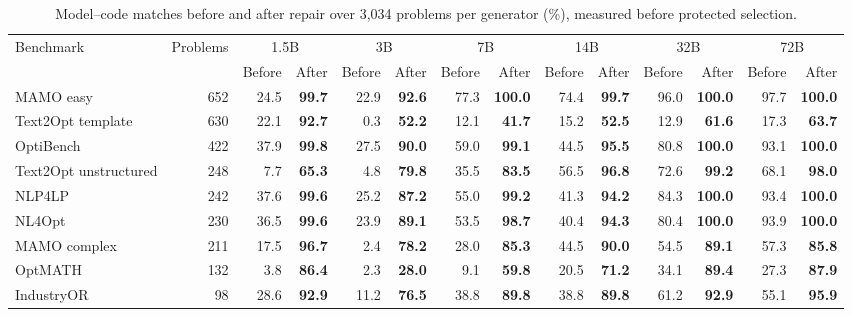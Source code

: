 \begin{table}[htbp]
\caption{Model--code matches before and after repair over 3,034 problems per generator (\%), measured before protected selection.}
\label{tab:completionmatrix}
\centering\footnotesize\renewcommand{\arraystretch}{0.96}\setlength{\tabcolsep}{0.5pt}
\begin{tabular*}{\textwidth}{@{\extracolsep{\fill}}lrrrrrrrrrrrrr@{}}
\toprule
\multirow{2}{*}{Benchmark} & \multirow{2}{*}{Problems} & \multicolumn{2}{c}{1.5B} & \multicolumn{2}{c}{3B} & \multicolumn{2}{c}{7B} & \multicolumn{2}{c}{14B} & \multicolumn{2}{c}{32B} & \multicolumn{2}{c}{72B} \\
\cmidrule(lr){3-4}\cmidrule(lr){5-6}\cmidrule(lr){7-8}\cmidrule(lr){9-10}\cmidrule(lr){11-12}\cmidrule(lr){13-14}
 & & Before & After & Before & After & Before & After & Before & After & Before & After & Before & After \\
\midrule
MAMO easy & 652 & 24.5 & \textbf{99.7} & 22.9 & \textbf{92.6} & 77.3 & \textbf{100.0} & 74.4 & \textbf{99.7} & 96.0 & \textbf{100.0} & 97.7 & \textbf{100.0} \\
Text2Opt template & 630 & 22.1 & \textbf{92.7} & 0.3 & \textbf{52.2} & 12.1 & \textbf{41.7} & 15.2 & \textbf{52.5} & 12.9 & \textbf{61.6} & 17.3 & \textbf{63.7} \\
OptiBench & 422 & 37.9 & \textbf{99.8} & 27.5 & \textbf{90.0} & 59.0 & \textbf{99.1} & 44.5 & \textbf{95.5} & 80.8 & \textbf{100.0} & 93.1 & \textbf{100.0} \\
Text2Opt unstructured & 248 & 7.7 & \textbf{65.3} & 4.8 & \textbf{79.8} & 35.5 & \textbf{83.5} & 56.5 & \textbf{96.8} & 72.6 & \textbf{99.2} & 68.1 & \textbf{98.0} \\
NLP4LP & 242 & 37.6 & \textbf{99.6} & 25.2 & \textbf{87.2} & 55.0 & \textbf{99.2} & 41.3 & \textbf{94.2} & 84.3 & \textbf{100.0} & 93.4 & \textbf{100.0} \\
NL4Opt & 230 & 36.5 & \textbf{99.6} & 23.9 & \textbf{89.1} & 53.5 & \textbf{98.7} & 40.4 & \textbf{94.3} & 80.4 & \textbf{100.0} & 93.9 & \textbf{100.0} \\
MAMO complex & 211 & 17.5 & \textbf{96.7} & 2.4 & \textbf{78.2} & 28.0 & \textbf{85.3} & 44.5 & \textbf{90.0} & 54.5 & \textbf{89.1} & 57.3 & \textbf{85.8} \\
OptMATH & 132 & 3.8 & \textbf{86.4} & 2.3 & \textbf{28.0} & 9.1 & \textbf{59.8} & 20.5 & \textbf{71.2} & 34.1 & \textbf{89.4} & 27.3 & \textbf{87.9} \\
IndustryOR & 98 & 28.6 & \textbf{92.9} & 11.2 & \textbf{76.5} & 38.8 & \textbf{89.8} & 38.8 & \textbf{89.8} & 61.2 & \textbf{92.9} & 55.1 & \textbf{95.9} \\

\end{tabular*}
\end{table}
